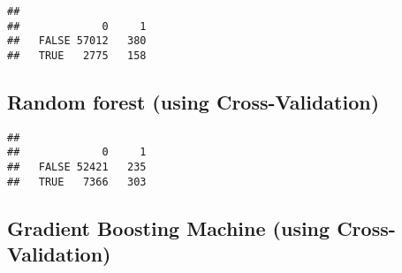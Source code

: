 \documentclass[]{article}
\newenvironment{Shaded}{\begin{snugshade}}{\end{snugshade}}
\newcommand{\KeywordTok}[1]{\textcolor[rgb]{0.13,0.29,0.53}{\textbf{#1}}}
\newcommand{\DataTypeTok}[1]{\textcolor[rgb]{0.13,0.29,0.53}{#1}}
\newcommand{\DecValTok}[1]{\textcolor[rgb]{0.00,0.00,0.81}{#1}}
\newcommand{\FloatTok}[1]{\textcolor[rgb]{0.00,0.00,0.81}{#1}}
\newcommand{\StringTok}[1]{\textcolor[rgb]{0.31,0.60,0.02}{#1}}
\newcommand{\OtherTok}[1]{\textcolor[rgb]{0.56,0.35,0.01}{#1}}
\newcommand{\OperatorTok}[1]{\textcolor[rgb]{0.81,0.36,0.00}{\textbf{#1}}}
\newcommand{\NormalTok}[1]{#1}
\begin{document}
\begin{verbatim}
##        
##             0     1
##   FALSE 57012   380
##   TRUE   2775   158
\end{verbatim}

\subsection{Random forest (using
Cross-Validation)}\label{random-forest-using-cross-validation}

\begin{Shaded}
\end{Shaded}

\begin{verbatim}
##        
##             0     1
##   FALSE 52421   235
##   TRUE   7366   303
\end{verbatim}

\subsection{Gradient Boosting Machine (using
Cross-Validation)}\label{gradient-boosting-machine-using-cross-validation}
\end{document}

